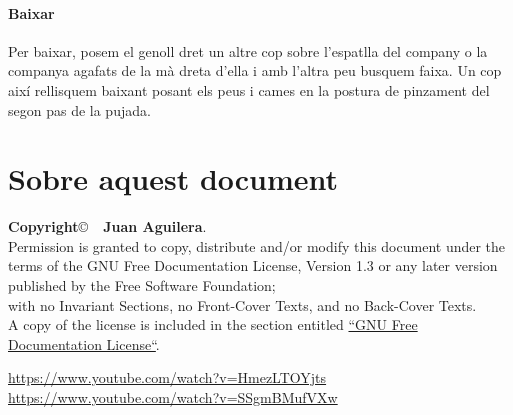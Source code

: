 \documentclass[a4paper]{article}
\begin{document}
\paragraph{Baixar \\}
Per baixar, posem el genoll dret un altre cop sobre l'espatlla del company o la companya agafats de la mà dreta d'ella i amb l'altra peu busquem faixa. Un cop així rellisquem baixant posant els peus i cames en la postura de pinzament del segon pas de la pujada.


\section{Sobre aquest document}
\textbf{Copyright}\copyright\ \textbf{\the\year\ Juan Aguilera}.\\
Permission is granted to copy, distribute and/or modify this document under the terms of the GNU Free Documentation License, Version 1.3 or any later version published by the Free Software Foundation;\\
with no Invariant Sections, no Front-Cover Texts, and no Back-Cover Texts.\\
A copy of the license is included in the section entitled \href{http://www.gnu.org/licenses/fdl.html}{``GNU Free Documentation License``}.

\begin{thebibliography}{99}
	 \url{https://www.youtube.com/watch?v=HmezLTOYjts}
	 \url{https://www.youtube.com/watch?v=SSgmBMufVXw}
\end{thebibliography}
\end{document}
